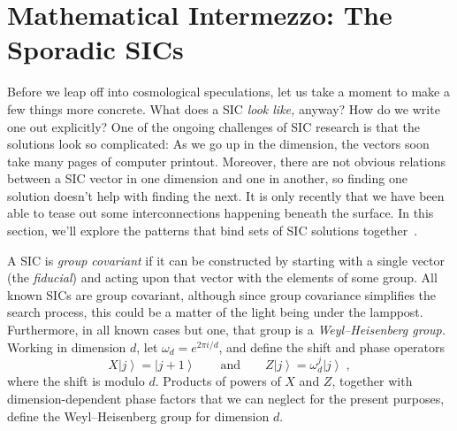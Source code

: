 \documentclass[aps,pra,superscriptaddress,12pt,tightenlines,nofootinbib]{revtex4-2}
\newcommand{\ket}[1]{{\ensuremath{\left| #1 \right\rangle}}}
\begin{document}
\section{Mathematical Intermezzo: The Sporadic SICs}

Before we leap off into cosmological speculations, let us take a
moment to make a few things more concrete.  What does a SIC {\it look
  like,} anyway?  How do we write one out explicitly?  One of the
ongoing challenges of SIC research is that the solutions look so
complicated: As we go up in the dimension, the vectors soon take many
pages of computer printout.  Moreover, there are not obvious relations
between a SIC vector in one dimension and one in another, so finding
one solution doesn't help with finding the next.  It is only recently
that we have been able to tease out some interconnections happening beneath
the surface.  In this section, we'll explore the patterns that bind
sets of SIC solutions together~\cite{RCF-SIC, stacey-sporadic}.


A SIC is \emph{group covariant} if it can be constructed by starting
with a single vector (the \emph{fiducial}) and acting upon that vector
with the elements of some group.  All known SICs are group covariant,
although since group covariance simplifies the search process, this
could be a matter of the light being under the lamppost.  Furthermore,
in all known cases but one, that group is a \emph{Weyl--Heisenberg group.}
Working in dimension $d$, let $\omega_d = e^{2\pi i / d}$, and define
the shift and phase operators
\begin{equation}
X\ket{j} = \ket{j+1}\qquad \mbox{and}\qquad Z\ket{j} = \omega_d^j \ket{j}\;,
\end{equation}
where the shift is modulo $d$.  Products of powers of $X$ and $Z$,
together with dimension-dependent phase factors that we can neglect
for the present purposes, define the Weyl--Heisenberg group for dimension $d$.
\end{document}
